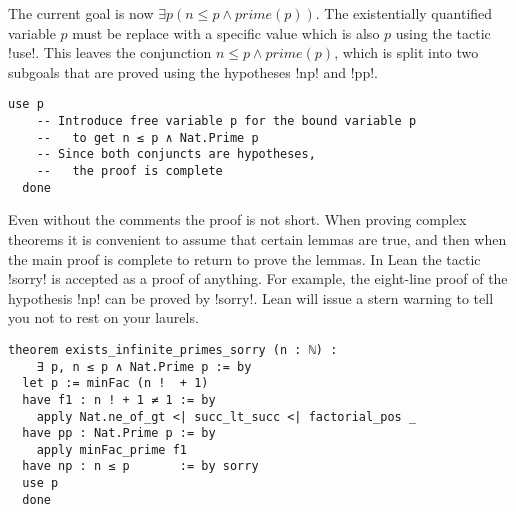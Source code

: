 The current goal is now $\exists p( n \leq p \wedge \mathit{prime}(p))$. The existentially quantified variable $p$ must be replace with a specific value which is also $p$ using the tactic !use!.  This leaves the conjunction $n \leq p \wedge \mathit{prime}(p)$, which is split into two subgoals that are proved using the hypotheses !np! and !pp!.

\begin{Verbatim}[firstnumber=last]
  use p
    -- Introduce free variable p for the bound variable p
    --   to get n ≤ p ∧ Nat.Prime p
    -- Since both conjuncts are hypotheses,
    --   the proof is complete
  done
\end{Verbatim}


Even without the comments the proof is not short. When proving complex theorems it is convenient to assume that certain lemmas are true, and then when the main proof is complete to return to prove the lemmas. In Lean the tactic !sorry! is accepted as a proof of anything. For example, the eight-line proof of the hypothesis !np! can be proved by !sorry!. Lean will issue a stern warning to tell you not to rest on your laurels.

\begin{Verbatim}[numbers=none]
theorem exists_infinite_primes_sorry (n : ℕ) :
    ∃ p, n ≤ p ∧ Nat.Prime p := by
  let p := minFac (n !  + 1)
  have f1 : n ! + 1 ≠ 1 := by
    apply Nat.ne_of_gt <| succ_lt_succ <| factorial_pos _
  have pp : Nat.Prime p := by
    apply minFac_prime f1
  have np : n ≤ p       := by sorry
  use p
  done
\end{Verbatim}


